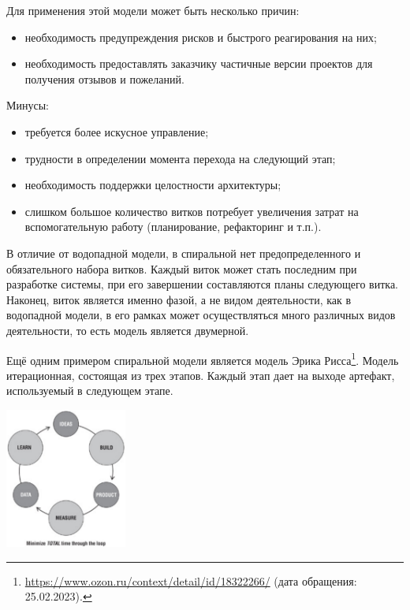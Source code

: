 \documentclass{../../text-style}
\begin{document}
Для применения этой модели может быть несколько причин:

\begin{itemize}
    \item необходимость предупреждения рисков и быстрого реагирования на них;
    \item необходимость предоставлять заказчику частичные версии проектов для получения отзывов и пожеланий.
\end{itemize}

Минусы:

\begin{itemize}
    \item требуется более искусное управление;
    \item трудности в определении момента перехода на следующий этап;
    \item необходимость поддержки целостности архитектуры;
    \item слишком большое количество витков потребует увеличения затрат на вспомогательную работу (планирование, рефакторинг и  т.п.).
\end{itemize}

В отличие от водопадной модели, в спиральной нет предопределенного и обязательного набора витков. Каждый виток может стать последним при разработке системы, при его завершении составляются планы следующего витка. Наконец, виток является именно фазой, а не видом деятельности, как в водопадной модели, в его рамках может осуществляться много различных видов деятельности, то есть модель является двумерной.

Ещё одним примером спиральной модели является модель Эрика Рисса\footnote{\url{https://www.ozon.ru/context/detail/id/18322266/} (дата обращения: 25.02.2023).}. Модель итерационная, состоящая из трех этапов. Каждый этап дает на выходе артефакт, используемый в следующем этапе. 

\begin{center}
    \includegraphics[width=0.3\textwidth]{theLeanStartupModel.png}
\end{center}
\end{document}
